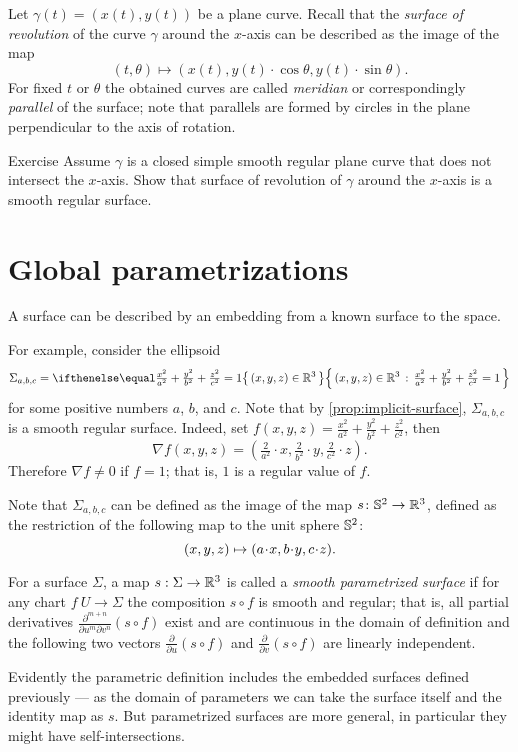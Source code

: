Let $\gamma(t)=(x(t),y(t))$ be a plane curve.
Recall that the \emph{surface of revolution} of the curve $\gamma$ around the $x$-axis can be described as the 
image of the map 
\[(t,\theta)\mapsto (x(t), y(t)\cdot\cos\theta,y(t)\cdot\sin\theta).\]
For fixed $t$ or $\theta$ the obtained curves are called \emph{meridian} or correspondingly \emph{parallel} of the surface; note that parallels are formed by circles in the plane perpendicular to the axis of rotation.

\begin{thm}{Exercise}\label{ex:revolution}
Assume $\gamma$ is a closed simple smooth regular plane curve that does not intersect the $x$-axis.
Show that surface of revolution of $\gamma$ around the $x$-axis is a smooth regular surface.
\end{thm}


\section*{Global parametrizations} 
A surface can be described by an embedding from a known surface to the space.

For example, consider the ellipsoid
\[\Sigma_{a,b,c}=\set{(x,y,z)\in\RR^3}{\tfrac{x^2}{a^2}+\tfrac{y^2}{b^2}+\tfrac{z^2}{c^2}=1}\]
for some positive numbers $a$, $b$, and $c$.
Note that by \ref{prop:implicit-surface}, $\Sigma_{a,b,c}$ is a smooth regular surface.
Indeed, set $f(x,y,z)=\tfrac{x^2}{a^2}+\tfrac{y^2}{b^2}+\tfrac{z^2}{c^2}$,
then
\[\nabla f(x,y,z)=(\tfrac{2}{a^2}\cdot x,\tfrac{2}{b^2}\cdot y,\tfrac{2}{c^2}\cdot z).\]
Therefore $\nabla f\ne0$ if $f=1$; that is, $1$ is a regular value of $f$.

Note that $\Sigma_{a,b,c}$ can be defined as the image of the map $s\colon\mathbb{S}^2\to\mathbb{R}^3$, defined as the restriction of the following map to the unit sphere $\mathbb{S}^2$:
\[(x,y,z)\z\mapsto (a\cdot x, b\cdot y,c\cdot z).\]

For a surface $\Sigma$, a map $s: \Sigma \to \mathbb{R} ^3$ is called a 
\emph{smooth parametrized surface} if for any chart $f\:U\to \Sigma$ 
the composition $s\circ f$ is smooth and regular;
that is, all partial derivatives $\frac{\partial^{m+n}}{\partial u^m\partial v^n}(s\circ f)$ exist and are continuous in the domain of definition and the following two vectors 
$\frac{\partial}{\partial u}(s\circ f)$ and $\frac{\partial}{\partial v}(s\circ f)$ are linearly independent.

Evidently the parametric definition includes the embedded surfaces defined previously --- as the domain of parameters we can take the surface itself and the identity map as $s$.
But parametrized surfaces are more general, in particular they  might  have self-intersections.

